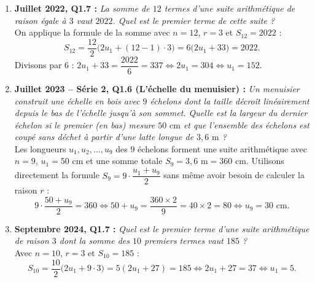 \begin{exemple}
\begin{enumerate}
    \item \textbf{Juillet 2022, Q1.7 :} \emph{La somme de $12$ termes d'une suite arithmétique de raison égale à $3$ vaut $2022$. Quel est le premier terme de cette suite ?}\\
    On applique la formule de la somme avec $n = 12$, $r = 3$ et $S_{12} = 2022$ :
    \[
        S_{12} = \frac{12}{2}\bigl(2u_1 + (12 - 1)\cdot 3\bigr) = 6\bigl(2u_1 + 33\bigr) = 2022.
    \]
    Divisons par $6$ : $2u_1 + 33 = \dfrac{2022}{6} = 337 \iff 2u_1 = 304 \iff \boxed{u_1 = 152}$.

    \item \textbf{Juillet 2023 -- Série 2, Q1.6 (L'échelle du menuisier) :} \emph{Un menuisier construit une échelle en bois avec $9$ échelons dont la taille décroît linéairement depuis le bas de l'échelle jusqu'à son sommet. Quelle est la largeur du dernier échelon si le premier (en bas) mesure $50\text{ cm}$ et que l'ensemble des échelons est coupé sans déchet à partir d'une latte longue de $3,6\text{ m}$ ?}\\
    Les longueurs $u_1, u_2, \dots, u_9$ des $9$ échelons forment une suite arithmétique avec $n = 9$, $u_1 = 50\text{ cm}$ et une somme totale $S_9 = 3,6\text{ m} = 360\text{ cm}$.
    Utilisons directement la formule $S_9 = 9 \cdot \dfrac{u_1 + u_9}{2}$ sans même avoir besoin de calculer la raison $r$ :
    \[
        9 \cdot \frac{50 + u_9}{2} = 360 \iff 50 + u_9 = \frac{360 \times 2}{9} = 40 \times 2 = 80 \iff \boxed{u_9 = 30\text{ cm}}.
    \]

    \item \textbf{Septembre 2024, Q1.7 :} \emph{Quel est le premier terme d'une suite arithmétique de raison $3$ dont la somme des $10$ premiers termes vaut $185$ ?}\\
    Avec $n = 10$, $r = 3$ et $S_{10} = 185$ :
    \[
        S_{10} = \frac{10}{2}\bigl(2u_1 + 9\cdot 3\bigr) = 5(2u_1 + 27) = 185 \iff 2u_1 + 27 = 37 \iff \boxed{u_1 = 5}.
    \]


\end{enumerate}
\end{exemple}
